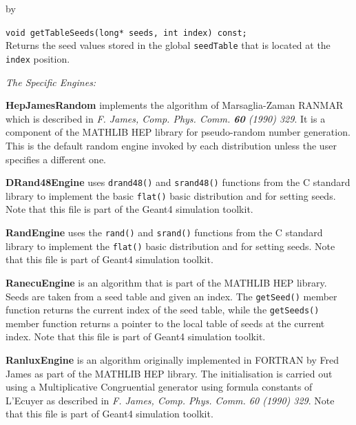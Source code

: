 \documentclass[twoside]{article}
\newcommand{\comp}[1]{\texttt{#1}}%
\newcommand{\entrylabel}[1]{\mbox{\textbf{{#1}}}\hfil}%
\newenvironment{entry}
{\begin{list}{}%
    {\renewcommand{\makelabel}{\entrylabel}%
     \setlength{\labelwidth}{90pt}%
     \setlength{\leftmargin}{\labelwidth}
     \advance\leftmargin by \labelsep%
      }%
    }%
  {\end{list}}
\newcommand{\Entrylabel}[1]%
{\raisebox{0pt}[1ex][0pt]{\makebox[\labelwidth][l]%
    {\parbox[t]{\labelwidth}{\hspace{0pt}\textbf{{#1}}}}}}
\newenvironment{Entry}%
{\renewcommand{\entrylabel}{\Entrylabel}\begin{entry}}%
  {\end{entry}}
\begin{document}
\begin{description}
\begin{Entry}
     \verb+void getTableSeeds(long* seeds, int index) const;+\\
     Returns the seed values stored in the global \comp{seedTable}
     that is located at the \comp{index} position.

     {\em The Specific Engines:}
     
     \begin{description}
       \item {\bf HepJamesRandom} implements the algorithm of
       Marsaglia-Zaman RANMAR which is described in
       {\em F.  James, Comp. Phys. Comm. {\bf 60} (1990) 329}.  It is a
       component of the MATHLIB HEP library for pseudo-random
       number generation.  This is the default random engine invoked
       by each distribution unless the user specifies a different one.

       \item {\bf DRand48Engine} uses \comp{drand48()}
         and \comp{srand48()} functions from the C standard library
         to implement the basic \comp{flat()} basic distribution and
         for setting seeds.  Note that this file is part of the
         Geant4  simulation toolkit.

       \item {\bf RandEngine} uses the \comp{rand()} and \comp{srand()}
         functions from the C standard library to implement the \comp{flat()}
         basic distribution and for setting seeds.  Note that this file is
         part of Geant4 simulation toolkit.

       \item {\bf RanecuEngine} is an algorithm that is part of the
         MATHLIB HEP library.  Seeds are taken from a seed table
         and given an index.  The \comp{getSeed()} member function
         returns the current index of the seed table, while the
         \comp{getSeeds()} member function returns a pointer to the
         local table of seeds at the current index.  Note that this file
         is part of Geant4 simulation toolkit.

       \item {\bf RanluxEngine} is an algorithm originally implemented
         in FORTRAN by Fred James as part of the MATHLIB HEP
         library.  The initialisation is carried out using a
         Multiplicative Congruential generator using formula constants
         of L'Ecuyer as described in {\em F. James, Comp. Phys. Comm. 60 (1990) 329}.
         Note that this file is part of Geant4 simulation toolkit.
     \end{description}


\end{Entry}
\end{description}
\end{document}
